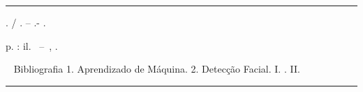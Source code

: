 %
%     
\begin{fichacatalografica}
	\vspace*{\fill}					%
	\hrule							%
	\begin{center}					%
	\begin{minipage}[c]{12.5cm}		%
	
	\imprimirautorinverso
	
	\hspace{0.5cm} \imprimirtitulo. / \imprimirautor. --
	\imprimirlocal.- \imprimirano.
	
	\hspace{0.5cm} \pageref{LastPage} p. : il.
	\bigbreak
	\hspace{0.5cm} \imprimirtipotrabalho~--~\imprimirinstituicao, \imprimirano.

	\hspace{0.5cm} \imprimirorientadorRotulo~\imprimirorientador
	\bigbreak
	\hspace{0.5cm} Bibliografia
	\bigbreak
	\hspace{0.5cm}
		1. Aprendizado de Máquina.
		2. Detecção Facial.
		I. \imprimirtitulo.
		II. \imprimirinstituicao
	\bigbreak
	\end{minipage}
	\end{center}
	\hrule
\end{fichacatalografica}
